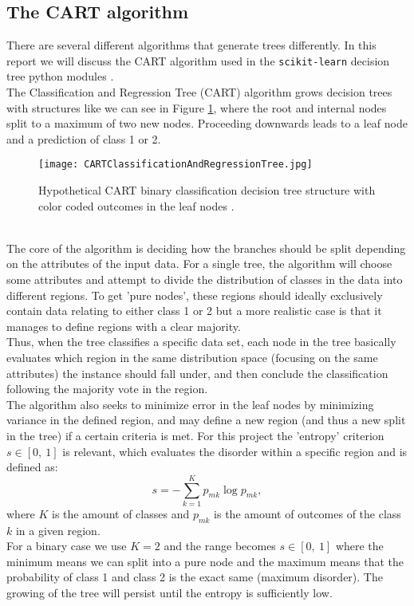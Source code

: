 \documentclass[reprint,english,notitlepage]{revtex4-1}  %
\begin{document}
\subsection{The CART algorithm}
\label{CART_algo}
There are several different algorithms that generate trees differently. In this report we will discuss the CART algorithm used in the {\lstinline[language={[python]TeX}, basicstyle=\ttfamily]|scikit-learn|} decision tree python modules \cite{morten}. 
\vspace{3mm}
\\ 
The Classification and Regression Tree (CART) algorithm grows decision trees with structures like we can see in Figure \ref{fig:CART}, where the root and internal nodes split to a maximum of two new nodes. Proceeding downwards leads to a leaf node and a prediction of class 1 or 2.
\begin{figure}[h!]
    \centering
    \texttt{[image: CARTClassificationAndRegressionTree.jpg]}
    \caption{Hypothetical CART binary classification decision tree structure with color coded outcomes in the leaf nodes \cite{CART}.}
    \label{fig:CART}
\end{figure}
\vspace{3mm}
\\ 
The core of the algorithm is deciding how the branches should be split depending on the attributes of the input data. For a single tree, the algorithm will choose some attributes and attempt to divide the distribution of classes in the data into different regions. To get 'pure nodes', these regions should ideally exclusively contain data relating to either class 1 or 2 but a more realistic case is that it manages to define regions with a clear majority.
\vspace{3mm}
\\ 
Thus, when the tree classifies a specific data set, each node in the tree basically evaluates which region in the same distribution space (focusing on the same attributes) the instance should fall under, and then conclude the classification following the majority vote in the region.
\vspace{3mm}
\\ 
The algorithm also seeks to minimize error in the leaf nodes by minimizing variance in the defined region, and may define a new region (and thus a new split in the tree) if a certain criteria is met. For this project the 'entropy' criterion $s \in [0, \ 1]$ is relevant, which evaluates the disorder within a specific region and is defined as:
\begin{equation}
    s = - \sum_{k=1}^K p_{mk} \log p_{mk},
\end{equation}
where $K$ is the amount of classes and $p_{mk}$ is the amount of outcomes of the class $k$ in a given region. 
\vspace{3mm}
\\ 
For a binary case we use $K = 2$ and the range becomes $s \in [0, \ 1]$ where the minimum means we can split into a pure node and the maximum means that the probability of class 1 and class 2 is the exact same (maximum disorder). The growing of the tree will persist until the entropy is sufficiently low. 
\end{document}
